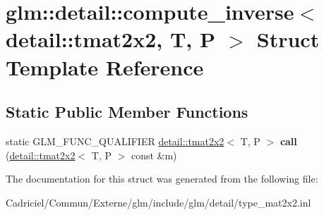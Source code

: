 \hypertarget{structglm_1_1detail_1_1compute__inverse_3_01detail_1_1tmat2x2_00_01_t_00_01_p_01_4}{}\section{glm\+:\+:detail\+:\+:compute\+\_\+inverse$<$ detail\+:\+:tmat2x2, T, P $>$ Struct Template Reference}
\label{structglm_1_1detail_1_1compute__inverse_3_01detail_1_1tmat2x2_00_01_t_00_01_p_01_4}
\subsection*{Static Public Member Functions}
\begin{DoxyCompactItemize}
\item 
static G\+L\+M\+\_\+\+F\+U\+N\+C\+\_\+\+Q\+U\+A\+L\+I\+F\+I\+ER \hyperlink{structglm_1_1detail_1_1tmat2x2}{detail\+::tmat2x2}$<$ T, P $>$ {\bfseries call} (\hyperlink{structglm_1_1detail_1_1tmat2x2}{detail\+::tmat2x2}$<$ T, P $>$ const \&m)\hypertarget{structglm_1_1detail_1_1compute__inverse_3_01detail_1_1tmat2x2_00_01_t_00_01_p_01_4_ab9c06b142ec7941cda76021e09240f30}{}\label{structglm_1_1detail_1_1compute__inverse_3_01detail_1_1tmat2x2_00_01_t_00_01_p_01_4_ab9c06b142ec7941cda76021e09240f30}

\end{DoxyCompactItemize}


The documentation for this struct was generated from the following file\+:\begin{DoxyCompactItemize}
\item 
Cadriciel/\+Commun/\+Externe/glm/include/glm/detail/type\+\_\+mat2x2.\+inl\end{DoxyCompactItemize}
